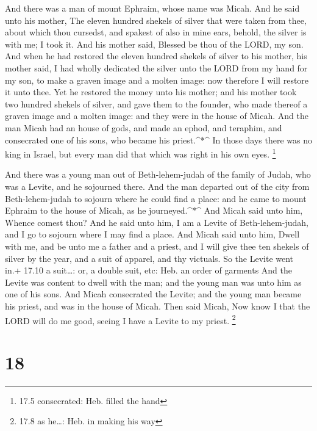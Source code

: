  And there was a man of mount Ephraim, whose name was Micah.
 And he said unto his mother, The eleven hundred shekels of
silver that were taken from thee, about which thou cursedst, and spakest
of also in mine ears, behold, the silver is with me; I took it. And his
mother said, Blessed be thou of the LORD, my son.  And when
he had restored the eleven hundred shekels of silver to his mother, his
mother said, I had wholly dedicated the silver unto the LORD from my
hand for my son, to make a graven image and a molten image: now
therefore I will restore it unto thee.  Yet he restored the
money unto his mother; and his mother took two hundred shekels of
silver, and gave them to the founder, who made thereof a graven image
and a molten image: and they were in the house of Micah. 
And the man Micah had an house of gods, and made an ephod, and teraphim,
and consecrated one of his sons, who became his priest.\^{}*\^{}
 In those days there was no king in Israel, but every man
did that which was right in his own eyes. \footnote{17.5 consecrated:
  Heb. filled the hand}

 And there was a young man out of Beth-lehem-judah of the
family of Judah, who was a Levite, and he sojourned there. 
And the man departed out of the city from Beth-lehem-judah to sojourn
where he could find a place: and he came to mount Ephraim to the house
of Micah, as he journeyed.\^{}*\^{}  And Micah said unto
him, Whence comest thou? And he said unto him, I am a Levite of
Beth-lehem-judah, and I go to sojourn where I may find a place.
 And Micah said unto him, Dwell with me, and be unto me a
father and a priest, and I will give thee ten shekels of silver by the
year, and a suit of apparel, and thy victuals. So the Levite went in.+
17.10 a suit\ldots: or, a double suit, etc: Heb. an order of garments
 And the Levite was content to dwell with the man; and the
young man was unto him as one of his sons.  And Micah
consecrated the Levite; and the young man became his priest, and was in
the house of Micah.  Then said Micah, Now know I that the
LORD will do me good, seeing I have a Levite to my priest. \footnote{17.8
  as he\ldots: Heb. in making his way}

\hypertarget{section-17}{%
\section{18}\label{section-17}}


